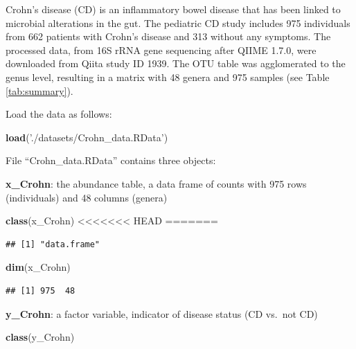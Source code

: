 \documentclass[openany]{book}
\newenvironment{Shaded}{\begin{snugshade}}{\end{snugshade}}
\newcommand{\KeywordTok}[1]{\textcolor[rgb]{0.13,0.29,0.53}{\textbf{#1}}}
\newcommand{\StringTok}[1]{\textcolor[rgb]{0.31,0.60,0.02}{#1}}
\newcommand{\NormalTok}[1]{#1}
\begin{document}
Crohn's disease (CD) is an inflammatory bowel disease that has been
linked to microbial alterations in the gut. The pediatric CD study
\citep{gevers2014treatment} includes 975 individuals from 662 patients
with Crohn's disease and 313 without any symptoms. The processed data,
from 16S rRNA gene sequencing after QIIME 1.7.0, were downloaded from
Qiita \citep{gonzalez2018qiita} study ID 1939. The OTU table was
agglomerated to the genus level, resulting in a matrix with 48 genera
and 975 samples (see Table \ref{tab:summary}).

Load the data as follows:

\begin{Shaded}
\begin{Highlighting}[]
\KeywordTok{load}\NormalTok{(}\StringTok{'./datasets/Crohn_data.RData'}\NormalTok{)}
\end{Highlighting}
\end{Shaded}

File ``Crohn\_data.RData'' contains three objects:

\textbf{x\_Crohn}: the abundance table, a data frame of counts with 975
rows (individuals) and 48 columns (genera)

\begin{Shaded}
\begin{Highlighting}[]
\KeywordTok{class}\NormalTok{(x_Crohn)}
<<<<<<< HEAD
=======
\end{Highlighting}
\end{Shaded}

\begin{verbatim}
## [1] "data.frame"
\end{verbatim}

\begin{Shaded}
\begin{Highlighting}[]
\KeywordTok{dim}\NormalTok{(x_Crohn)}
\end{Highlighting}
\end{Shaded}

\begin{verbatim}
## [1] 975  48
\end{verbatim}

\textbf{y\_Crohn}: a factor variable, indicator of disease status (CD
vs.~not CD)

\begin{Shaded}
\begin{Highlighting}[]
\KeywordTok{class}\NormalTok{(y_Crohn)}
\end{Highlighting}
\end{Shaded}
\end{document}

